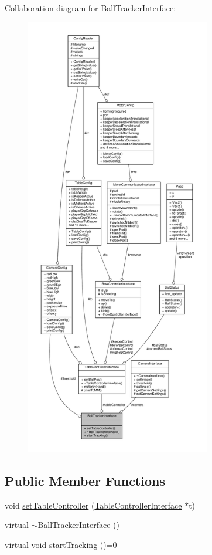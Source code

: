 Collaboration diagram for Ball\+Tracker\+Interface\+:\nopagebreak
\begin{figure}[H]
\begin{center}
\leavevmode
\includegraphics[height=550pt]{class_ball_tracker_interface__coll__graph}
\end{center}
\end{figure}
\subsection*{Public Member Functions}
\begin{DoxyCompactItemize}
\item 
void \hyperlink{class_ball_tracker_interface_a009a2a29aa7993a2405741daf707afbb}{set\+Table\+Controller} (\hyperlink{class_table_controller_interface}{Table\+Controller\+Interface} $\ast$t)
\item 
virtual \hyperlink{class_ball_tracker_interface_a85a4559b18c41e1a88da092ab8a7f42d}{$\sim$\+Ball\+Tracker\+Interface} ()
\item 
virtual void \hyperlink{class_ball_tracker_interface_af140a5a17f082a74ff06bee64ef055ba}{start\+Tracking} ()=0
\end{DoxyCompactItemize}
